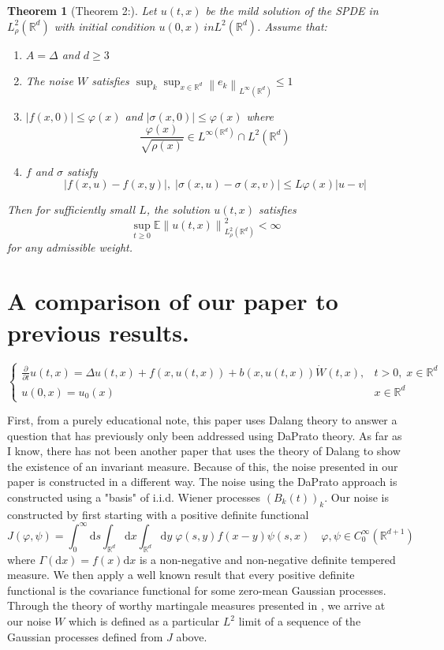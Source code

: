 \documentclass[a4paper,11pt]{article}%
\numberwithin{equation}{section}
\theoremstyle{plain}
\newtheorem{theorem}{Theorem}[section]
\theoremstyle{definition}
\newcommand{\R}{\mathbb{R}}
\newcommand{\Norm}[1]{\left\|  #1   \right\|}
\newcommand{\ud}{\ensuremath{ \mathrm{d} }}
\begin{document}
	\begin{theorem}[Theorem 2:]
Let $u(t,x)$ be the mild solution of the SPDE in $L^2_{\rho}(\R^d)$ with initial condition $u(0,x) \ in L^2(\R^d)$. Assume that:
		\begin{enumerate}
			\item $A = \Delta$ and $d \ge 3$
			\item The noise $W$ satisfies $	\sup_k \sup_{x\in \R^d} \Norm{e_k}_{L^\infty(\R^d)} \le 1$
			\item $|f(x,0)| \le \varphi(x)$ and $|\sigma(x,0)| \le \varphi(x)$ where
				\[
					\frac{\varphi(x)}{\sqrt{\rho(x)}} \in L^{\infty(\R^d)} \cap L^2(\R^d)
				\]
			\item $f$ and $\sigma$ satisfy
				\[
					|f(x,u) - f(x,y)|, \; |\sigma(x,u) - \sigma(x,v)| \le L\varphi(x)|u-v|
				\]
		\end{enumerate}
Then for sufficiently small $L$, the solution $u(t,x)$ satisfies
	\[
			\sup_{t \ge 0} \mathbb{E}\Norm{u(t,x)}_{L^2_{\rho}(\R^d)}^2 < \infty
	\]
for any admissible weight.
	\end{theorem}

\section{A comparison of our paper to previous results.}
	\[
		\begin{cases}
			\frac{\partial}{\partial t} u(t,x) = \Delta u(t,x) + f(x,u(t,x)) + b(x,u(t,x)) \dot{W}(t,x), & t>0, \; x \in \R^d
			\\ u(0,x) = u_0(x) & x \in \R^d
		\end{cases}
	\]

First, from a purely educational note, this paper uses Dalang theory to answer a question that has previously only been addressed using DaPrato theory. As far as I know, there has not been another paper that uses the theory of Dalang to show the existence of an invariant measure. Because of this, the noise presented in our paper is constructed in a different way. The noise using the DaPrato approach is constructed using a "basis" of i.i.d. Wiener processes $(B_k(t))_k$. Our noise is constructed by first starting with a positive definite functional
	\[
		J(\varphi, \psi) = \int_0^\infty \ud s \int_{\R^d} \ud x \int_{\R^d} \ud y \; \varphi(s,y) f(x-y) \psi(s,x) \quad \varphi, \psi \in C^\infty_0(\R^{d+1})
	\]
where $\Gamma(\ud x) = f(x) \ud x$ is a non-negative and non-negative definite tempered measure. We then apply a well known result that every positive definite functional is the covariance functional for some zero-mean Gaussian processes. Through the theory of worthy martingale measures presented in \cite{DalangEtc09Minicourse}, we arrive at our noise $W$ which is defined as a particular $L^2$ limit of a sequence of the Gaussian processes defined from $J$ above.
\end{document}
